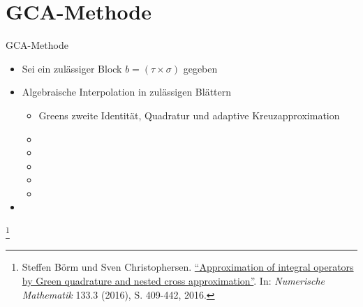\documentclass[10pt]{beamer}
\let\svthefootnote\thefootnote
\begin{document}
\section{GCA-Methode}

\begin{frame}{GCA-Methode}
  \begin{itemize}
    \item Sei ein zulässiger Block \(b = (\tau \times \sigma)\) gegeben
    \item Algebraische Interpolation in zulässigen Blättern
    \begin{itemize}
      \item Greens zweite Identität, Quadratur und adaptive Kreuzapproximation
      \item {}
      \item {}
      \item {}
      \item {}
      \item {}
    \end{itemize}
    \item {}
  \end{itemize}

  \footnotesize
  \let\thefootnote\relax\footnote{Steffen Börm und Sven Christophersen.
  \href{https://link.springer.com/article/10.1007\%2Fs00211-015-0757-y}{
  ``Approximation of integral operators by Green quadrature and nested cross 
  approximation''}. In:   \textit{Numerische Mathematik} 133.3 (2016), S. 
  409-442, 2016.}
  \addtocounter{footnote}{-1}\let\thefootnote\svthefootnote\relax
  \normalsize
\end{frame}
\end{document}
